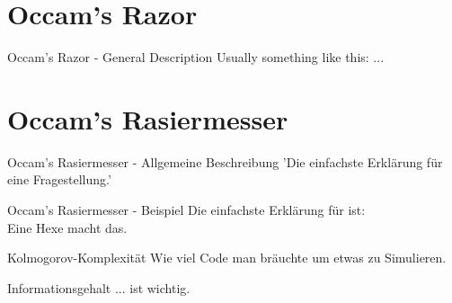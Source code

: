 \ifEnglish

\section{Occam's Razor}

\begin{frame}[c]{Occam's Razor - General Description}
    Usually something like this: ...
\end{frame}



\else


\section{Occam's Rasiermesser}

\begin{frame}[c]{Occam's Rasiermesser - Allgemeine Beschreibung}
    \Large
    'Die einfachste Erklärung für eine Fragestellung.'
\end{frame}


\begin{frame}[c]{Occam's Rasiermesser - Beispiel}
    \Large
    Die einfachste Erklärung für \underline{\hspace{2cm}} ist: \\
    \pause
    Eine Hexe macht das.
\end{frame}


\begin{frame}[c]{Kolmogorov-Komplexität}
    \Large
    \pause
    Wie viel Code man bräuchte um etwas zu Simulieren.
\end{frame}


\begin{frame}[standout]
    Informationsgehalt ... \pause ist wichtig.
\end{frame}

\fi
